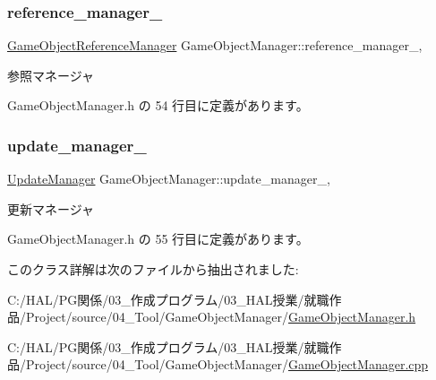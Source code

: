 \subsubsection{\texorpdfstring{reference\+\_\+manager\+\_\+}{reference\_manager\_}}
{\footnotesize\ttfamily \mbox{\hyperlink{class_game_object_reference_manager}{Game\+Object\+Reference\+Manager}} Game\+Object\+Manager\+::reference\+\_\+manager\+\_\+\hspace{0.3cm}{\ttfamily [static]}, {\ttfamily [private]}}



参照マネージャ 



 Game\+Object\+Manager.\+h の 54 行目に定義があります。

\mbox{\label{class_game_object_manager_a330c1759e1a075fb257a01c6f48cf9f3}} 
\subsubsection{\texorpdfstring{update\+\_\+manager\+\_\+}{update\_manager\_}}
{\footnotesize\ttfamily \mbox{\hyperlink{class_update_manager}{Update\+Manager}} Game\+Object\+Manager\+::update\+\_\+manager\+\_\+\hspace{0.3cm}{\ttfamily [static]}, {\ttfamily [private]}}



更新マネージャ 



 Game\+Object\+Manager.\+h の 55 行目に定義があります。



このクラス詳解は次のファイルから抽出されました\+:\begin{DoxyCompactItemize}
\item 
C\+:/\+H\+A\+L/\+P\+G関係/03\+\_\+作成プログラム/03\+\_\+\+H\+A\+L授業/就職作品/\+Project/source/04\+\_\+\+Tool/\+Game\+Object\+Manager/\mbox{\hyperlink{_game_object_manager_8h}{Game\+Object\+Manager.\+h}}\item 
C\+:/\+H\+A\+L/\+P\+G関係/03\+\_\+作成プログラム/03\+\_\+\+H\+A\+L授業/就職作品/\+Project/source/04\+\_\+\+Tool/\+Game\+Object\+Manager/\mbox{\hyperlink{_game_object_manager_8cpp}{Game\+Object\+Manager.\+cpp}}\end{DoxyCompactItemize}
